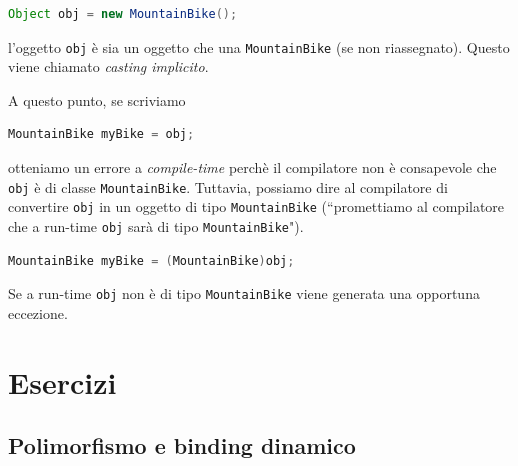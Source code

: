 \documentclass{article}
\begin{document}
\begin{lstlisting}[language=Java,escapechar=|]
Object obj = new MountainBike();
\end{lstlisting}
l'oggetto \texttt{obj} \`e sia un oggetto che una \texttt{MountainBike} (se non riassegnato). Questo viene chiamato \emph{casting implicito}.

A questo punto, se scriviamo 
\begin{lstlisting}[language=Java,escapechar=|]
MountainBike myBike = obj;
\end{lstlisting}
otteniamo un errore a \emph{compile-time} perch\`e il compilatore non \`e consapevole che \texttt{obj} \`e di classe \texttt{MountainBike}. Tuttavia, possiamo dire al compilatore di convertire \texttt{obj} in un oggetto di tipo \texttt{MountainBike} (``promettiamo al compilatore che a run-time \texttt{obj} sar\`a di tipo \texttt{MountainBike}").

\begin{lstlisting}[language=Java,escapechar=|]
MountainBike myBike = (MountainBike)obj;
\end{lstlisting}
Se a run-time \texttt{obj} non \`e di tipo \texttt{MountainBike} viene generata una opportuna eccezione.

\section{Esercizi}


\subsection{Polimorfismo e binding dinamico}
\end{document}
